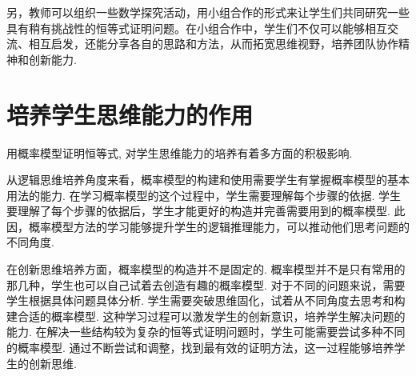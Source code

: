 另，教师可以组织一些数学探究活动，用小组合作的形式来让学生们共同研究一些具有稍有挑战性的恒等式证明问题。在小组合作中，学生们不仅可以能够相互交流、相互启发，还能分享各自的思路和方法，从而拓宽思维视野，培养团队协作精神和创新能力. 





\section{培养学生思维能力的作用}
用概率模型证明恒等式, 对学生思维能力的培养有着多方面的积极影响. 

从逻辑思维培养角度来看，概率模型的构建和使用需要学生有掌握概率模型的基本用法的能力. 在学习概率模型的这个过程中，学生需要理解每个步骤的依据. 学生要理解了每个步骤的依据后，学生才能更好的构造并完善需要用到的概率模型. 此因，概率模型方法的学习能够提升学生的逻辑推理能力，可以推动他们思考问题的不同角度. 


在创新思维培养方面，概率模型的构造并不是固定的. 概率模型并不是只有常用的那几种，学生也可以自己试着去创造有趣的概率模型. 对于不同的问题来说，需要学生根据具体问题具体分析. 学生需要突破思维固化，试着从不同角度去思考和构建合适的概率模型. 这种学习过程可以激发学生的创新意识，培养学生解决问题的能力. 在解决一些结构较为复杂的恒等式证明问题时，学生可能需要尝试多种不同的概率模型. 通过不断尝试和调整，找到最有效的证明方法，这一过程能够培养学生的创新思维. 




